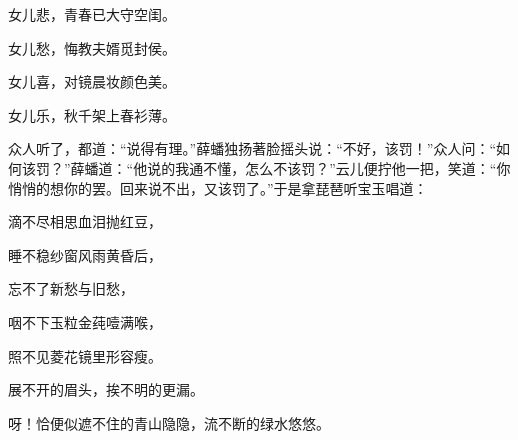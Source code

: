 \begin{poem}

    \begin{pl} 女儿悲，青春已大守空闺。 \end{pl}

    \begin{pl} 女儿愁，悔教夫婿觅封侯。 \end{pl}

    \begin{pl} 女儿喜，对镜晨妆颜色美。 \end{pl}

    \begin{pl} 女儿乐，秋千架上春衫薄。 \end{pl}
\end{poem}

\begin{parag}
    众人听了，都道：“说得有理。”薛蟠独扬著脸摇头说：“不好，该罚！”众人问：“如何该罚？”薛蟠道：“他说的我通不懂，怎么不该罚？”云儿便拧他一把，笑道：“你悄悄的想你的罢。回来说不出，又该罚了。”于是拿琵琶听宝玉唱道：
\end{parag}
\begin{poem}

    \begin{pl}

        滴不尽相思血泪抛红豆，
    \end{pl}
    \begin{pl}

        睡不稳纱窗风雨黄昏后，
    \end{pl}
    \begin{pl}

        忘不了新愁与旧愁，
    \end{pl}
    \begin{pl}

        咽不下玉粒金莼噎满喉，
    \end{pl}
    \begin{pl}

        照不见菱花镜里形容瘦。
    \end{pl}
    \begin{pl}

        展不开的眉头，挨不明的更漏。
    \end{pl}
    \begin{pl}

        呀！恰便似遮不住的青山隐隐，流不断的绿水悠悠。
    \end{pl}
\end{poem}


